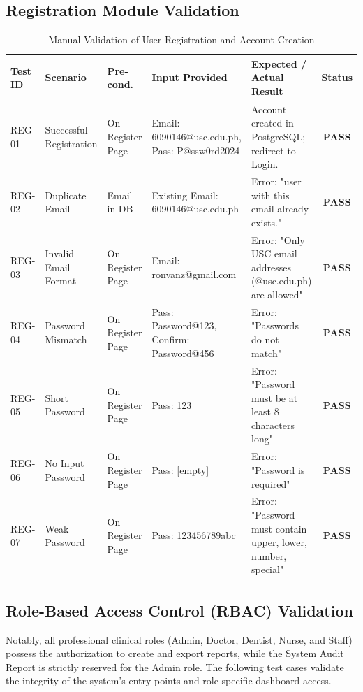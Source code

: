 \subsection{Registration Module Validation}
\begin{table}[H]
\centering
\caption{Manual Validation of User Registration and Account Creation}
\begin{tabularx}{\textwidth}{|l|Y|Y|Y|Y|c|}
\hline
\textbf{Test ID} & \textbf{Scenario} & \textbf{Pre-cond.} & \textbf{Input Provided} & \textbf{Expected / Actual Result} & \textbf{Status} \\
\hline
REG-01 & Successful Registration & On Register Page & Email: 6090146@usc.edu.ph, Pass: P@ssw0rd2024 & Account created in PostgreSQL; redirect to Login. & \textbf{PASS} \\
\hline
REG-02 & Duplicate Email & Email in DB & Existing Email: 6090146@usc.edu.ph & Error: "user with this email already exists." & \textbf{PASS} \\
\hline
REG-03 & Invalid Email Format & On Register Page & Email: ronvanz@gmail.com & Error: "Only USC email addresses (@usc.edu.ph) are allowed" & \textbf{PASS} \\
\hline
REG-04 & Password Mismatch & On Register Page & Pass: Password@123, Confirm: Password@456 & Error: "Passwords do not match" & \textbf{PASS} \\
\hline
REG-05 & Short Password & On Register Page & Pass: 123 & Error: "Password must be at least 8 characters long" & \textbf{PASS} \\
\hline
REG-06 & No Input Password & On Register Page & Pass: [empty] & Error: "Password is required" & \textbf{PASS} \\
\hline
REG-07 & Weak Password & On Register Page & Pass: 123456789abc & Error: "Password must contain upper, lower, number, special" & \textbf{PASS} \\
\hline
\end{tabularx}
\end{table}

\subsection{Role-Based Access Control (RBAC) Validation}
Notably, all professional clinical roles (Admin, Doctor, Dentist, Nurse, and Staff) possess the authorization to create and export reports, while the System Audit Report is strictly reserved for the Admin role. The following test cases validate the integrity of the system's entry points and role-specific dashboard access.

